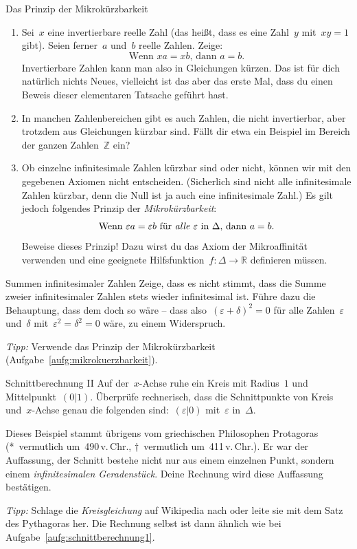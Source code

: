 \documentclass[twoside]{../zirkelblatt}
\newcommand{\ZZ}{\mathbb{Z}}
\newcommand{\RR}{\mathbb{R}}
\theoremstyle{definition}
\theoremstyle{plain}
\theoremstyle{remark}
\begin{document}
\begin{aufgabeShaded}{Das Prinzip der Mikrokürzbarkeit}
\label{aufg:mikrokuerzbarkeit}
\begin{enumerate}
\item Sei~$x$ eine invertierbare reelle Zahl (das heißt, dass es eine Zahl~$y$
mit~$xy = 1$ gibt). Seien ferner~$a$ und~$b$ reelle Zahlen. Zeige:
\[ \text{Wenn $xa = xb$, dann $a = b$.} \]
Invertierbare Zahlen kann man also in Gleichungen kürzen. Das ist für dich
natürlich nichts Neues, vielleicht ist das aber das erste Mal, dass du einen
Beweis dieser elementaren Tatsache geführt hast.

\item In manchen Zahlenbereichen gibt es auch Zahlen, die nicht invertierbar,
aber trotzdem aus Gleichungen kürzbar sind. Fällt dir etwa ein Beispiel im
Bereich der ganzen Zahlen~$\ZZ$ ein?

\item Ob einzelne infinitesimale Zahlen kürzbar sind oder nicht, können wir mit
den gegebenen Axiomen nicht entscheiden. (Sicherlich sind nicht alle
infinitesimale Zahlen kürzbar, denn die Null ist ja auch eine infinitesimale
Zahl.) Es gilt jedoch folgendes Prinzip der \emph{Mikrokürzbarkeit}:
\[ \text{Wenn~$\varepsilon a = \varepsilon b$ für \emph{alle} $\varepsilon$
in~$\Delta$, dann $a = b$.} \]
Beweise dieses Prinzip! Dazu wirst du das Axiom der Mikroaffinität verwenden
und eine geeignete Hilfsfunktion~$f : \Delta \to \RR$ definieren müssen.
\end{enumerate}
\end{aufgabeShaded}

\newpage
\begin{aufgabeShaded}{Summen infinitesimaler Zahlen}
Zeige, dass es nicht stimmt, dass die Summe zweier infinitesimaler Zahlen
stets wieder infinitesimal ist. Führe dazu die Behauptung, dass dem doch so wäre --
dass also~$(\varepsilon + \delta)^2 = 0$ für alle Zahlen~$\varepsilon$
und~$\delta$ mit~$\varepsilon^2 = \delta^2 = 0$ wäre, zu einem Widerspruch.

\emph{Tipp:} Verwende das Prinzip der Mikrokürzbarkeit
(Aufgabe~\ref{aufg:mikrokuerzbarkeit}).
\end{aufgabeShaded}

\begin{aufgabeShaded}{Schnittberechnung II}
Auf der~$x$-Achse ruhe ein Kreis mit Radius~$1$ und Mittelpunkt~$(0|1)$.
Überprüfe rechnerisch, dass die Schnittpunkte von Kreis und~$x$-Achse genau die
folgenden sind:~$(\varepsilon|0)$ mit~$\varepsilon$ in~$\Delta$.

Dieses Beispiel stammt übrigens vom griechischen Philosophen Protagoras
(*~vermutlich um~490\,v.\,Chr., †~vermutlich um~411\,v.\,Chr.). Er
war der Auffassung, der Schnitt bestehe nicht nur aus einem einzelnen Punkt,
sondern einem \emph{infinitesimalen Geradenstück}. Deine Rechnung wird diese
Auffassung bestätigen.

\emph{Tipp:} Schlage die \emph{Kreisgleichung} auf Wikipedia nach oder leite
sie mit dem Satz des Pythagoras her. Die Rechnung selbst ist dann ähnlich wie
bei Aufgabe~\ref{aufg:schnittberechnung1}.
\end{aufgabeShaded}
\end{document}
